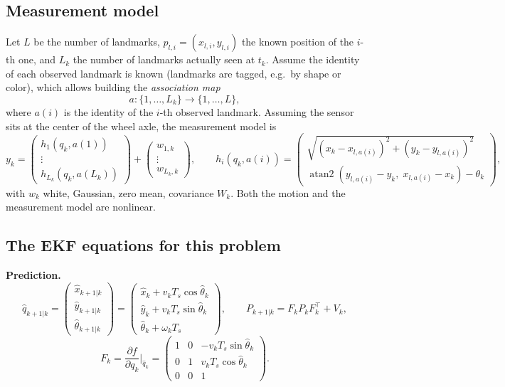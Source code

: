 \documentclass[11pt,a4paper]{article}
\def\boldsymbol#1{#1}%
\def\mathbf#1{#1}%
\DeclareMathOperator{\atantwo}{atan2}
\newcommand{\tp}{^{\top}}
\newcommand{\Ts}{T_s}
\newcommand{\hq}{\hat{\boldsymbol{q}}}
\newcommand{\bq}{\boldsymbol{q}}
\newcommand{\by}{\boldsymbol{y}}
\newcommand{\bw}{\boldsymbol{w}}
\newcommand{\mF}{\mathbf{F}}
\newcommand{\mP}{\mathbf{P}}
\newcommand{\mV}{\mathbf{V}}
\newcommand{\mW}{\mathbf{W}}
\theoremstyle{definition}
\theoremstyle{plain}
\theoremstyle{remark}
\begin{document}
\subsection{Measurement model}

Let $L$ be the number of landmarks, $\boldsymbol p_{l,i}=(x_{l,i},y_{l,i})$ the known position of the $i$-th one, and $L_k$ the number of landmarks actually seen at $t_k$.
Assume the identity of each observed landmark is known (landmarks are tagged, e.g.\ by shape or color), which allows building the \emph{association map}
\[
a:\{1,\dots,L_k\}\to\{1,\dots,L\},
\]
where $a(i)$ is the identity of the $i$-th observed landmark. Assuming the sensor sits at the center of the wheel axle, the measurement model is
\begin{equation}\label{eq:meas}
\by_k=\begin{pmatrix}\boldsymbol h_1(\bq_k,a(1))\\\vdots\\\boldsymbol h_{L_k}(\bq_k,a(L_k))\end{pmatrix}+\begin{pmatrix}\bw_{1,k}\\\vdots\\\bw_{L_k,k}\end{pmatrix},\qquad
\boldsymbol h_i(\bq_k,a(i))=\begin{pmatrix}\sqrt{(x_k-x_{l,a(i)})^2+(y_k-y_{l,a(i)})^2}\\[2pt]
\atantwo(y_{l,a(i)}-y_k,\;x_{l,a(i)}-x_k)-\theta_k\end{pmatrix},
\end{equation}
with $\bw_k$ white, Gaussian, zero mean, covariance $\mW_k$. Both the motion and the measurement model are nonlinear.

\subsection{The EKF equations for this problem}

\noindent\textbf{Prediction.}
\[
\hq_{k+1|k}=\begin{pmatrix}\hat x_{k+1|k}\\\hat y_{k+1|k}\\\hat\theta_{k+1|k}\end{pmatrix}=\begin{pmatrix}\hat x_k+v_k\Ts\cos\hat\theta_k\\\hat y_k+v_k\Ts\sin\hat\theta_k\\\hat\theta_k+\omega_k\Ts\end{pmatrix},\qquad
\mP_{k+1|k}=\mF_k\mP_k\mF_k\tp+\mV_k,
\]
\begin{equation}\label{eq:F}
\mF_k=\frac{\partial\boldsymbol f}{\partial\bq_k}\Big|_{\hq_k}=\begin{pmatrix}1&0&-v_k\Ts\sin\hat\theta_k\\0&1&v_k\Ts\cos\hat\theta_k\\0&0&1\end{pmatrix}.
\end{equation}
\end{document}

